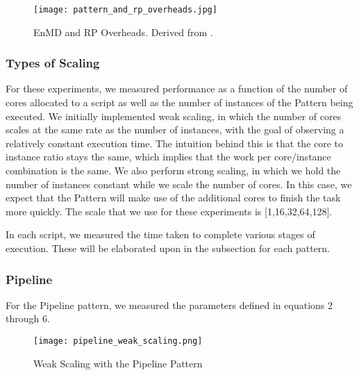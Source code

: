 \documentclass[]{article}
\begin{document}
			\begin{figure}[H]
				\centering
				\texttt{[image: pattern\_and\_rp\_overheads.jpg]}
				\caption{EnMD and RP Overheads. Derived from \cite{rp_state_diagram}.}
				\label{fig:pattern_rp_overheads}
			\end{figure}

		\subsubsection{Types of Scaling}
			For these experiments, we measured performance as a function of the number of cores allocated to a script as well as the number of instances of the Pattern being executed. We initially implemented weak scaling, in which the number of cores scales at the same rate as the number of instances, with the goal of observing a relatively constant execution time. The intuition behind this is that the core to instance ratio stays the same, which implies that the work per core/instance combination is the same. We also perform strong scaling, in which we hold the number of instances constant while we scale the number of cores. In this case, we expect that the Pattern will make use of the additional cores to finish the task more quickly. The scale that we use for these experiments is [1,16,32,64,128].

			In each script, we measured the time taken to complete various stages of execution. These will be elaborated upon in the subsection for each pattern.

		\subsubsection{Pipeline}
			For the Pipeline pattern, we measured the parameters defined in equations 2 through 6. 

			\begin{figure}[H]
				\centering
				\texttt{[image: pipeline\_weak\_scaling.png]}
				\caption{Weak Scaling with the Pipeline Pattern}
				\label{fig:pipeline_weak_scaling}
			\end{figure}
\end{document}
